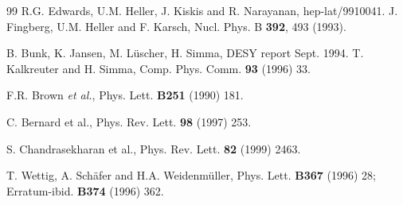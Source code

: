 \documentclass[11pt]{article}
\begin{document}
\begin{thebibliography}{99}
 R.G. Edwards, U.M. Heller, J. Kiskis and R. Narayanan,
hep-lat/9910041.
 J. Fingberg, U.M. Heller and F. Karsch,
Nucl. Phys. B {\bf 392}, 493 (1993).


B. Bunk, K. Jansen, M. L\"{u}scher, H. Simma, DESY report
Sept. 1994.\newline 
T. Kalkreuter and H. Simma, Comp. Phys. Comm. {\bf 93} (1996) 33.

 F.R. Brown {\sl et al.}, Phys. Lett. {\bf B251} (1990) 181.

C. Bernard et al., Phys. Rev. Lett. {\bf 98} (1997) 253.

S. Chandrasekharan et al., Phys. Rev. Lett. {\bf 82} (1999)
2463. 

T. Wettig, A. Sch\"afer and H.A. Weidenm\"uller,
Phys. Lett. {\bf B367} (1996) 28;\newline
Erratum-ibid. {\bf B374} (1996) 362.


\end{thebibliography}
\end{document}
